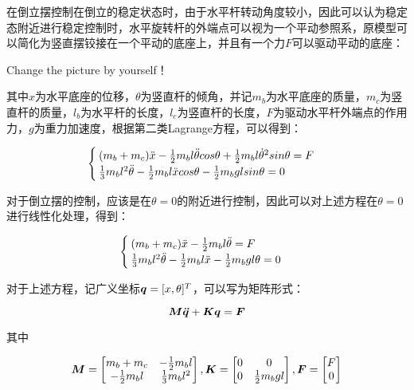 \documentclass[UTF8]{ctexart}
\begin{document}
在倒立摆控制在倒立的稳定状态时，由于水平杆转动角度较小，因此可以认为稳定态附近进行稳定控制时，水平旋转杆的外端点可以视为一个平动参照系，原模型可以简化为竖直摆铰接在一个平动的底座上，并且有一个力$F$可以驱动平动的底座：

\begin{center}
    Change the picture by yourself！
\end{center}

其中$x$为水平底座的位移，$\theta$为竖直杆的倾角，并记$m_b$为水平底座的质量，$m_c$为竖直杆的质量，$l_b$为水平杆的长度，$l_c$为竖直杆的长度，$F$为驱动水平杆外端点的作用力，$g$为重力加速度，根据第二类Lagrange方程，可以得到：

\begin{equation}
    \begin{cases}
        (m_b+m_c) \ddot{x}-\frac{1}{2} m_b l \ddot{\theta}cos\theta+\frac{1}{2} m_b l {\dot{\theta}}^2 sin\theta=F\\
        \frac{1}{3} m_b l^2 \ddot{\theta}-\frac{1}{2} m_b l \ddot{x} cos\theta-\frac{1}{2} m_b g l sin\theta = 0 
    \end{cases}
\end{equation}

\noindent 对于倒立摆的控制，应该是在$\theta = 0$的附近进行控制，因此可以对上述方程在$\theta = 0$进行线性化处理，得到：

\begin{equation}
    \begin{cases}
        (m_b+m_c) \ddot{x}-\frac{1}{2} m_b l \ddot{\theta} = F\\
        \frac{1}{3} m_b l^2 \ddot{\theta}-\frac{1}{2} m_b l \ddot{x} -\frac{1}{2} m_b g l \theta = 0 
    \end{cases}
\end{equation}

\noindent 对于上述方程，记广义坐标$\boldsymbol{q}=[x,\theta]^T$，可以写为矩阵形式：

\begin{equation}
    \boldsymbol{M} \boldsymbol{\ddot{q}} + \boldsymbol{K} \boldsymbol{q} = \boldsymbol{F}
\end{equation}

\noindent 其中

\begin{equation}
    \boldsymbol{M} = \begin{bmatrix}
        m_b+m_c & -\frac{1}{2} m_b l\\
        -\frac{1}{2} m_b l & \frac{1}{3} m_b l^2
    \end{bmatrix},
    \boldsymbol{K} = \begin{bmatrix}
        0 & 0\\
        0 & \frac{1}{2} m_b g l
    \end{bmatrix},
    \boldsymbol{F} = \begin{bmatrix}
        F\\
        0
    \end{bmatrix}
\end{equation}
\end{document}
